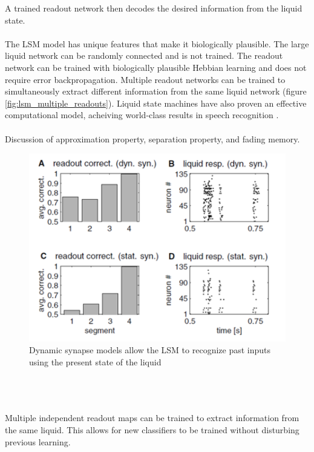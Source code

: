 \documentclass[a4paper,11pt]{article}
\begin{document}
A trained readout network then decodes the desired information from the liquid state. 
\\ \\
The LSM model has unique features that make it biologically plausible. 
The large liquid network can be randomly connected and is not trained.
The readout network can be trained with biologically plausible Hebbian learning and does not require error backpropagation.
Multiple readout networks can be trained to simultaneously extract different information from the same liquid network (figure \ref{fig:lsm_multiple_readouts}).
Liquid state machines have also proven an effective computational model, acheiving world-class results in speech recognition \cite{zhang2015}.
\\ \\
Discussion of approximation property, separation property, and fading memory.
\\
\begin{figure}
 \caption{Dynamic synapse models allow the LSM to recognize past inputs using the present state of the liquid \cite{maas2002}}
 \label{fig:lsm_memory}
 \centering
   \includegraphics[width=\textwidth]{fig/maas_memory}
\end{figure}\\
\\ \\
Multiple independent readout maps can be trained to extract information from the same liquid.
This allows for new classifiers to be trained without disturbing previous learning.
\end{document}

